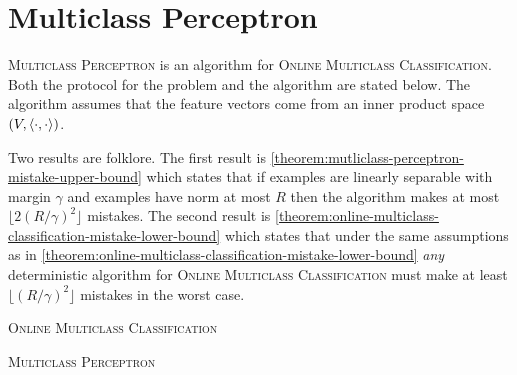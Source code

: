 \section{Multiclass Perceptron}
\label{section:multiclass-perceptron-proofs}

\textsc{Multiclass Perceptron} is an algorithm for \textsc{Online Multiclass
Classification}. Both the protocol for the problem and the algorithm are stated
below. The algorithm assumes that the feature vectors come from an inner product
space $(V, \left\langle \cdot, \cdot \right\rangle)$.

Two results are folklore. The first result is
\autoref{theorem:mutliclass-perceptron-mistake-upper-bound} which states that if
examples are linearly separable with margin $\gamma$ and examples have norm
at most $R$ then the algorithm makes at most $\lfloor 2 (R/\gamma)^2 \rfloor$
mistakes. The second result is
\autoref{theorem:online-multiclass-classification-mistake-lower-bound} which
states that under the same assumptions as in
\autoref{theorem:online-multiclass-classification-mistake-lower-bound}
\emph{any} deterministic algorithm for \textsc{Online Multiclass Classification}
must make at least $\lfloor (R/\gamma)^2 \rfloor$ mistakes in the worst case.

\begin{protocol}[h]
\caption{\textsc{Online Multiclass Classification}
\label{algorithm:mutliclass-classification}}
\begin{algorithmic}[1]
{
\ENDFOR
}
\end{algorithmic}
\end{protocol}

\begin{algorithm}[h]
\caption{\textsc{Multiclass Perceptron}
\label{algorithm:mutliclass-perceptron}}
\begin{algorithmic}[1]
{
\ELSE
{}
\ENDIF
\ENDFOR
}
\end{algorithmic}
\end{algorithm}

